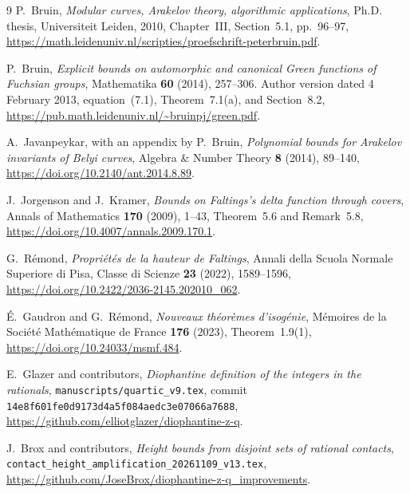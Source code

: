 \documentclass[11pt,a4paper]{article}
\theoremstyle{definition}
\begin{document}
\begin{thebibliography}{9}
P.~Bruin, \emph{Modular curves, Arakelov theory, algorithmic
applications}, Ph.D. thesis, Universiteit Leiden, 2010,
Chapter~III, Section~5.1, pp.~96--97,
\url{https://math.leidenuniv.nl/scripties/proefschrift-peterbruin.pdf}.

P.~Bruin, \emph{Explicit bounds on automorphic and canonical
Green functions of Fuchsian groups}, Mathematika \textbf{60}
(2014), 257--306. Author version dated 4 February 2013,
equation~(7.1), Theorem~7.1(a), and Section~8.2,
\url{https://pub.math.leidenuniv.nl/~bruinpj/green.pdf}.

A.~Javanpeykar, with an appendix by P.~Bruin,
\emph{Polynomial bounds for Arakelov invariants of Belyi curves},
Algebra \& Number Theory \textbf{8} (2014), 89--140,
\url{https://doi.org/10.2140/ant.2014.8.89}.

J.~Jorgenson and J.~Kramer,
\emph{Bounds on Faltings's delta function through covers},
Annals of Mathematics \textbf{170} (2009), 1--43,
Theorem~5.6 and Remark~5.8,
\url{https://doi.org/10.4007/annals.2009.170.1}.

G.~R\'emond, \emph{Propri\'et\'es de la hauteur de Faltings},
Annali della Scuola Normale Superiore di Pisa, Classe di Scienze
\textbf{23} (2022), 1589--1596,
\url{https://doi.org/10.2422/2036-2145.202010_062}.

\'E.~Gaudron and G.~R\'emond,
\emph{Nouveaux th\'eor\`emes d'isog\'enie},
M\'emoires de la Soci\'et\'e Math\'ematique de France
\textbf{176} (2023), Theorem~1.9(1),
\url{https://doi.org/10.24033/msmf.484}.

E.~Glazer and contributors,
\emph{Diophantine definition of the integers in the rationals},
\texttt{manuscripts/quartic\_v9.tex}, commit
\texttt{14e8f601fe0d9173d4a5f084aedc3e07066a7688},
\url{https://github.com/elliotglazer/diophantine-z-q}.

J.~Brox and contributors,
\emph{Height bounds from disjoint sets of rational contacts},
\texttt{contact\_height\_amplification\_20261109\_v13.tex},
\url{https://github.com/JoseBrox/diophantine-z-q_improvements}.
\end{thebibliography}
\end{document}
